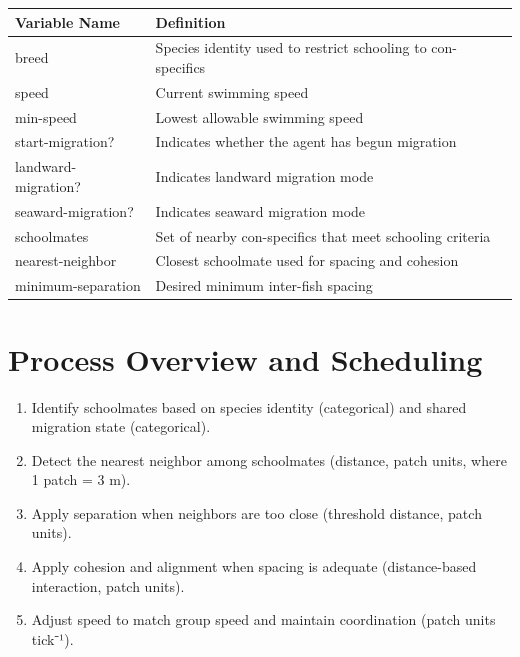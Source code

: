 \documentclass[
]{book}
\begin{document}
\begin{longtable}[]{@{}
  >{\raggedright\arraybackslash}p{}
  >{\raggedright\arraybackslash}p{}@{}}
\toprule\noalign{}
\begin{minipage}[b]{\linewidth}\raggedright
Variable Name
\end{minipage} & \begin{minipage}[b]{\linewidth}\raggedright
Definition
\end{minipage} \\
\midrule\noalign{}
\endhead
\bottomrule\noalign{}
\endlastfoot
breed & Species identity used to restrict schooling to con-specifics \\
speed & Current swimming speed \\
min-speed & Lowest allowable swimming speed \\
start-migration? & Indicates whether the agent has begun migration \\
landward-migration? & Indicates landward migration mode \\
seaward-migration? & Indicates seaward migration mode \\
schoolmates & Set of nearby con-specifics that meet schooling criteria \\
nearest-neighbor & Closest schoolmate used for spacing and cohesion \\
minimum-separation & Desired minimum inter-fish spacing \\
\end{longtable}

\section{Process Overview and Scheduling}\label{process-overview-and-scheduling-9}

\begin{enumerate}
\def\labelenumi{\arabic{enumi}.}
\item
  Identify schoolmates based on species identity (categorical) and
  shared migration state (categorical).
\item
  Detect the nearest neighbor among schoolmates (distance, patch
  units, where 1 patch = 3 m).
\item
  Apply separation when neighbors are too close (threshold distance,
  patch units).
\item
  Apply cohesion and alignment when spacing is adequate
  (distance-based interaction, patch units).
\item
  Adjust speed to match group speed and maintain coordination (patch
  units tick⁻¹).
\end{enumerate}
\end{document}
